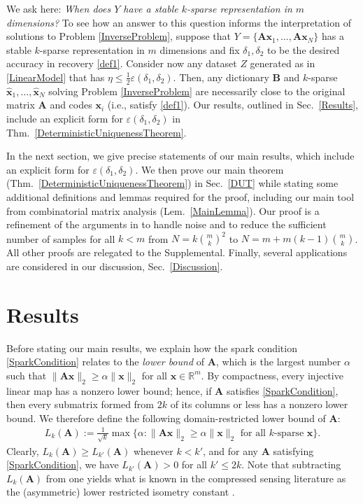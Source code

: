 \documentclass[9pt,twocolumn]{pnas-new}
\begin{document}
We ask here: \emph{When does $Y$ have a stable $k$-sparse representation in $m$ dimensions?} To see how an answer to this question informs the interpretation of solutions to Problem \ref{InverseProblem}, suppose that \mbox{$Y = \{\mathbf{A} \mathbf{x}_1, \ldots, \mathbf{A}\mathbf{x}_N\}$} has a stable $k$-sparse representation in $m$ dimensions and fix $\delta_1, \delta_2$ to be the desired accuracy in recovery \eqref{def1}. Consider now any dataset $Z$ generated as in \eqref{LinearModel} that has $\eta \leq \frac{1}{2} \varepsilon(\delta_1, \delta_2)$. Then, any dictionary $\mathbf{B}$ and $k$-sparse $\mathbf{\hat x}_1, \ldots, \mathbf{\hat x}_N$ solving Problem \ref{InverseProblem} are necessarily close to the original matrix $\mathbf{A}$ and codes $\mathbf{x}_i$ (i.e., satisfy \eqref{def1}). Our results, outlined in Sec.~\ref{Results}, include an explicit form for $\varepsilon(\delta_1, \delta_2)$ in Thm.~\ref{DeterministicUniquenessTheorem}. 

In the next section, we give precise statements of our main results, which include an explicit form for $\varepsilon(\delta_1, \delta_2)$. We then prove our main theorem (Thm.~\ref{DeterministicUniquenessTheorem}) in Sec.~\ref{DUT} while stating some additional definitions and lemmas required for the proof, including our main tool from combinatorial matrix analysis (Lem.~\ref{MainLemma}). Our proof is a refinement of the arguments in \cite{Hillar15} to handle noise and to reduce the sufficient number of samples for all $k < m$ from $N=k{m \choose k}^2$ to $N = m + m(k-1){m \choose k}$. All other proofs are relegated to the Supplemental. Finally, several applications are considered in our discussion, Sec.~\ref{Discussion}.

\section{Results}

Before stating our main results, we explain how the spark condition \eqref{SparkCondition} relates to the \emph{lower bound} \cite{Grcar10} of $\mathbf{A}$, which is the largest number $\alpha$ such that \mbox{$\|\mathbf{A}\mathbf{x}\|_2 \geq \alpha\|\mathbf{x}\|_2$} for all $\mathbf{x} \in \mathbb{R}^m$. By compactness, every injective linear map has a nonzero lower bound; hence, if $\mathbf{A}$ satisfies \eqref{SparkCondition}, then every submatrix formed from $2k$ of its columns or less has a nonzero lower bound. We therefore define the following domain-restricted lower bound of $\mathbf{A}$:
\begin{align*}
L_k(\mathbf{A}) := \frac{1}{\sqrt{k}}\max \{ \alpha : \|\mathbf{A}\mathbf{x}\|_2 \geq \alpha\|\mathbf{x}\|_2 \text{ for all $k$-sparse } \mathbf{x}\}.
\end{align*} 
Clearly, $L_k(\mathbf{A}) \geq L_{k'}(\mathbf{A})$ whenever $k < k'$, and for any $\mathbf{A}$ satisfying \eqref{SparkCondition}, we have $L_{k'}(\mathbf{A}) > 0$ for all $k' \leq 2k$. Note that subtracting $L_k(\mathbf{A})$ from one yields what is known in the compressed sensing literature as the (asymmetric) lower restricted isometry constant \cite{Blanchard2011, Foucart2009}. 
\end{document}
